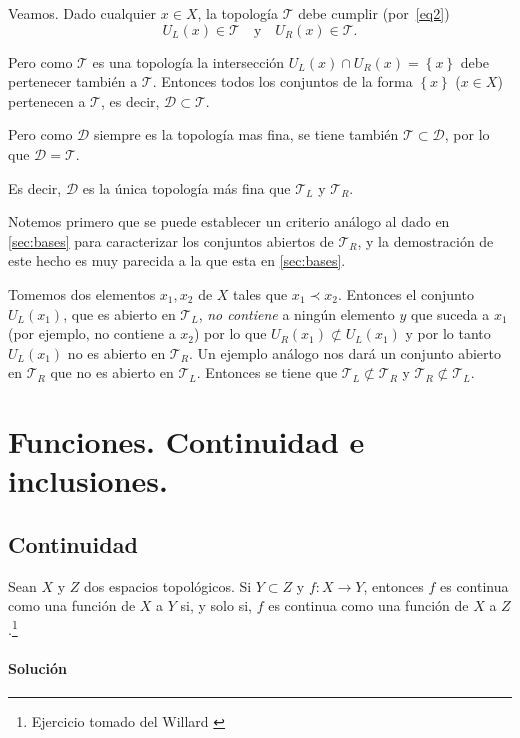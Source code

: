 \documentclass[letterpaper,10pt,final]{article}
\begin{document}
Veamos. Dado cualquier $x\in X$, la topología $\mathcal{T}$ debe cumplir (por~\ref{eq2})
\[
U_L(x)\in\mathcal{T}\quad\text{y}\quad U_R(x)\in\mathcal{T}.
\]

Pero como $\mathcal{T}$ es una topología la intersección $U_L(x)\cap U_R(x)=\left\{ x \right\}$ debe pertenecer también a $\mathcal{T}.$
Entonces todos los conjuntos de la forma $\left\{ x \right\}$ ($x\in X$) pertenecen a $\mathcal{T}$, es decir, $\mathcal{D}\subset\mathcal{T}$.

Pero como $\mathcal{D}$ siempre es la topología mas fina, se tiene también $\mathcal{T}\subset\mathcal{D}$, por lo que
$\mathcal{D}=\mathcal{T}$.

Es decir, $\mathcal{D}$ es la única topología más fina que $\mathcal{T}_L$ y $\mathcal{T}_R$.

Notemos primero que se puede establecer un criterio análogo al dado en \ref{sec:bases}
para caracterizar los conjuntos abiertos de $\mathcal{T}_R$, y la demostración de este hecho
es muy parecida a la que esta en \ref{sec:bases}.

Tomemos dos elementos $x_1,x_2$ de $X$ tales que $x_1\prec x_2$. Entonces el conjunto $U_L(x_1)$, que
es abierto en $\mathcal{T}_L$, \emph{no contiene} a ningún elemento $y$ que suceda a $x_1$ (por ejemplo,
no contiene a $x_2$) por lo que $U_R(x_1)\not\subset U_L(x_1)$ y por lo tanto $U_L(x_1)$ no es abierto
en $\mathcal{T}_R$. Un ejemplo análogo nos dará un conjunto abierto en $\mathcal{T}_R$ que no es abierto
en $\mathcal{T}_L$. Entonces se tiene que $\mathcal{T}_L\not\subset\mathcal{T}_R$ y $\mathcal{T}_R\not\subset\mathcal{T}_L$.

\section{Funciones. Continuidad e inclusiones.}\label{sec:fun}

\subsection{Continuidad}

Sean $X$ y $Z$ dos espacios topológicos. Si $Y\subset Z$ y $f\colon X\to Y$, entonces $f$ es continua como una función de $X$ a $Y$ si, y solo si, $f$ es continua como una función de $X$ a $Z$.\footnote{Ejercicio tomado del Willard \cite[Nº E7]{willard_general_1970}}

\paragraph{Solución}
\end{document}
